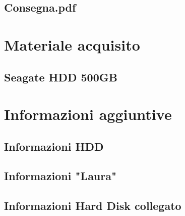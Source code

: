 \documentclass[a4paper,12pt]{report}
\begin{document}
\subsection{Consegna.pdf}
\vspace{5pt}


\pagebreak

\section{Materiale acquisito}
\subsection{Seagate HDD 500GB}


\section{Informazioni aggiuntive}
\subsection{Informazioni HDD}


\subsection{Informazioni "Laura"}


\subsection{Informazioni Hard Disk collegato}

\end{document}

